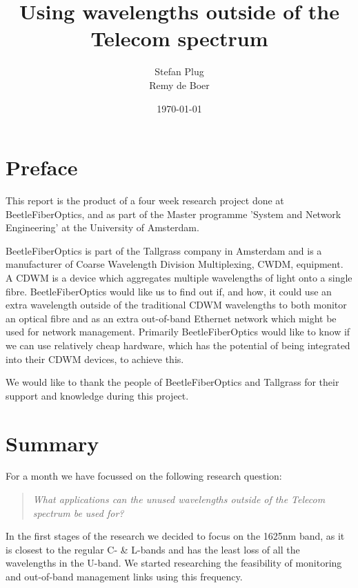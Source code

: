 \documentclass{article}
\begin{document}
\title{Using wavelengths outside of the Telecom spectrum}
\author{Stefan Plug\\Remy de Boer}
\date{\today}
\maketitle

\thispagestyle{empty}
\newpage

\section*{Preface}
This report is the product of a four week research project done at BeetleFiberOptics, and as part of the Master programme 'System and Network Engineering' at the University of Amsterdam\cite{uva:os3}.

BeetleFiberOptics is part of the Tallgrass company in Amsterdam and is a manufacturer of Coarse Wavelength Division Multiplexing, CWDM, equipment. A CDWM is a device which aggregates multiple wavelengths of light onto a single fibre. BeetleFiberOptics would like us to find out if, and how, it could use an extra wavelength outside of the traditional CDWM wavelengths to both monitor an optical fibre and as an extra out-of-band Ethernet network which might be used for network management. Primarily BeetleFiberOptics would like to know if we can use relatively cheap hardware, which has the potential of being integrated into their CDWM devices, to achieve this.

We would like to thank the people of BeetleFiberOptics and Tallgrass for their support and knowledge during this project.

\newpage
\section*{Summary}
For a month we have focussed on the following research question:
\begin{quote}
\textit{
What applications can the unused wavelengths outside of the Telecom spectrum be used for?
}
\end{quote}
In the first stages of the research we decided to focus on the 1625nm band, as it is closest to the regular C- \& L-bands and has the least loss of all the wavelengths in the U-band.
We started researching the feasibility of monitoring and out-of-band management links using this frequency.
\end{document}
